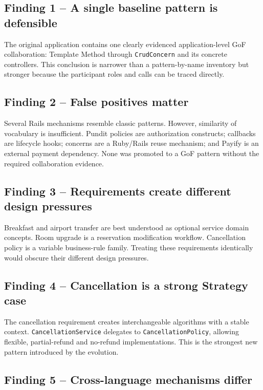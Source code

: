 \documentclass[10pt,a4paper]{article}
\newcommand{\code}[1]{\texttt{\small #1}}
\begin{document}
\subsection{Finding 1 -- A single baseline pattern is defensible}

The original application contains one clearly evidenced application-level GoF collaboration: Template Method through \code{CrudConcern} and its concrete controllers. This conclusion is narrower than a pattern-by-name inventory but stronger because the participant roles and calls can be traced directly.

\subsection{Finding 2 -- False positives matter}

Several Rails mechanisms resemble classic patterns. However, similarity of vocabulary is insufficient. Pundit policies are authorization constructs; callbacks are lifecycle hooks; concerns are a Ruby/Rails reuse mechanism; and Payify is an external payment dependency. None was promoted to a GoF pattern without the required collaboration evidence.

\subsection{Finding 3 -- Requirements create different design pressures}

Breakfast and airport transfer are best understood as optional service domain concepts. Room upgrade is a reservation modification workflow. Cancellation policy is a variable business-rule family. Treating these requirements identically would obscure their different design pressures.

\subsection{Finding 4 -- Cancellation is a strong Strategy case}

The cancellation requirement creates interchangeable algorithms with a stable context. \code{CancellationService} delegates to \code{CancellationPolicy}, allowing flexible, partial-refund and no-refund implementations. This is the strongest new pattern introduced by the evolution.

\subsection{Finding 5 -- Cross-language mechanisms differ}
\end{document}
